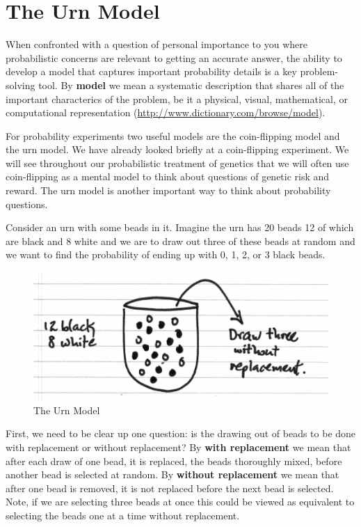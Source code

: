 \documentclass[]{book}
\theoremstyle{definition}
\theoremstyle{definition}
\theoremstyle{definition}
\theoremstyle{remark}
\begin{document}
\section{The Urn Model}\label{the_urn_model}

When confronted with a question of personal importance to you where
probabilistic concerns are relevant to getting an accurate answer, the
ability to develop a model that captures important probability details
is a key problem-solving tool. By \textbf{model} we mean a systematic
description that shares all of the important characterics of the
problem, be it a physical, visual, mathematical, or computational
representation (\url{http://www.dictionary.com/browse/model}).

For probability experiments two useful models are the coin-flipping
model and the urn model. We have already looked briefly at a
coin-flipping experiment. We will see throughout our probabilistic
treatment of genetics that we will often use coin-flipping as a mental
model to think about questions of genetic risk and reward. The urn model
is another important way to think about probability questions.

Consider an urn with some beads in it. Imagine the urn has 20 beads 12
of which are black and 8 white and we are to draw out three of these
beads at random and we want to find the probability of ending up with 0,
1, 2, or 3 black beads.

\begin{figure}

{\centering \includegraphics[width=0.6\linewidth]{01-basics-figures/urn1_picture} 

}

\caption{The Urn Model}\label{fig:nice-fig-5}
\end{figure}

First, we need to be clear up one question: is the drawing out of beads
to be done with replacement or without replacement? By \textbf{with
replacement} we mean that after each draw of one bead, it is replaced,
the beads thoroughly mixed, before another bead is selected at random.
By \textbf{without replacement} we mean that after one bead is removed,
it is not replaced before the next bead is selected. Note, if we are
selecting three beads at once this could be viewed as equivalent to
selecting the beads one at a time without replacement.
\end{document}
